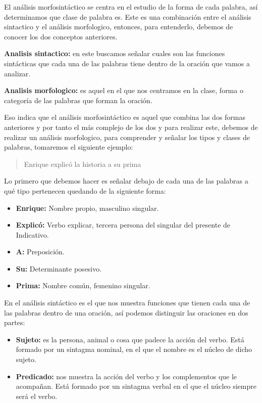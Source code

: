 El análisis morfosintáctico se centra en el estudio de la forma de cada palabra, así determinamos que clase de palabra es. Este es una combinación entre el análisis sintactico y el análisis morfologico, entonces, para entenderlo, debemos de conocer los dos conceptos anteriores.

\textbf{Analisis sintactico:} en este buscamos señalar cuales son las funciones sintácticas que cada una de las palabras tiene dentro de la oración que vamos a analizar.

\textbf{Analisis morfologico:} es aquel en el que nos centramos en la clase, forma o categoría de las palabras que forman la oración.

Eso indica que el análisis morfosintáctico es aquel que combina las dos formas anteriores y por tanto el más complejo de los dos y para realizar este, debemos de realizar un análisis morfologico, para comprender y señalar los tipos y clases de palabras, tomaremos el siguiente ejemplo:

\begin{quote}
    Enrique explicó la historia a su prima
\end{quote}

Lo primero que debemos hacer es señalar debajo de cada una de las palabras a qué tipo pertenecen quedando de la siguiente forma:
\begin{itemize}
    \item \textbf{Enrique:} Nombre propio, masculino singular.
    \item \textbf{Explicó:} Verbo explicar, tercera persona del singular del presente de Indicativo.
    \item \textbf{A:} Preposición.
    \item \textbf{Su:} Determinante posesivo.
    \item \textbf{Prima:} Nombre común, femenino singular.
\end{itemize}

En el análisis sintáctico es el que nos muestra funciones que tienen cada una de las palabras dentro de una oración, así podemos distinguir las oraciones en dos partes:
\begin{itemize}
    \item \textbf{Sujeto:} es la persona, animal o cosa que padece la acción del verbo. Está formado por un sintagma nominal, en el que el nombre es el núcleo de dicho sujeto.
    \item \textbf{Predicado:} nos muestra la acción del verbo y los complementos que le acompañan. Está formado por un sintagma verbal en el que el núcleo siempre será el verbo.
\end{itemize}

